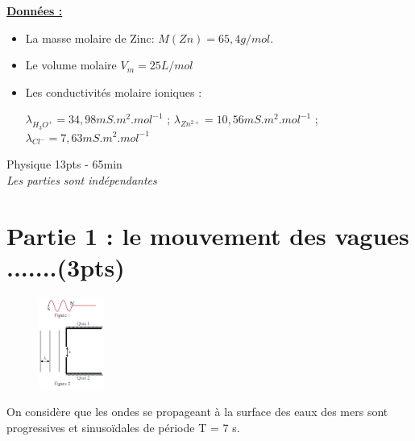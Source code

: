 \documentclass[12pt]{article}
\begin{document}
\begin{center}
\textbf{\underline{ Données : } }

\begin{itemize}
	\item La masse molaire de Zinc: $M(Zn) = 65,4g/mol$.
	\item Le volume molaire $V_m = 25L/mol$
	\item Les conductivités molaire ioniques : 

		$\lambda_{H_3O^+}=34,98 mS.m^2.mol^{-1}$ ; $ \lambda_{Zn^{2+}}=10,56mS.m^2.mol^{-1}$ ; $\lambda_{Cl^-}=7,63 mS.m^2.mol^{-1}$
\end{itemize}

\end{center}



\begin{center}
\hrulefill
\Large{Physique 13pts - 65min}
\hrulefill\\
    \emph{Les  parties sont indépendantes}
\end{center}

\vspace{-1cm}
\section*{Partie 1 :  le mouvement des vagues .......(3pts)}
\vspace{-0.4cm}

\begin{figure}
  \begin{center}
	  \vspace{-2cm}
	\includegraphics[width=0.19\textwidth]{./img/ex6.png}
  \end{center}
\end{figure}
On considère que les ondes se propageant à la surface des eaux des mers sont progressives et
sinusoïdales de période T = 7 s.
\end{document}
